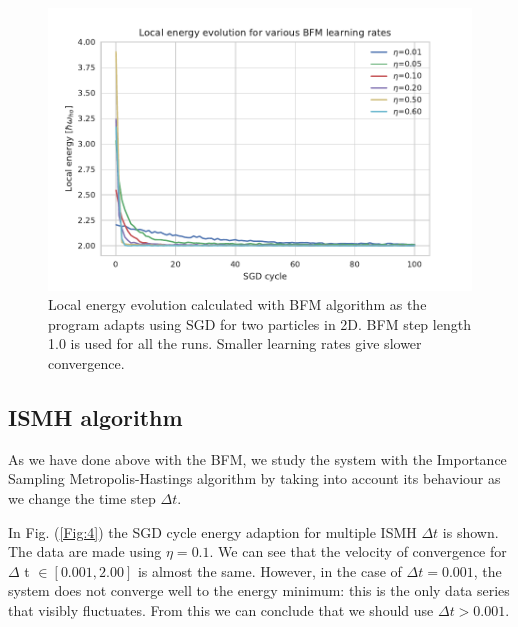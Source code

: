 \begin{figure}[H]
\centering
\includegraphics[scale=1.00]{plot3.pdf}
\caption{Local energy evolution calculated with BFM algorithm as the program adapts using SGD for two particles in 2D. BFM step length 1.0 is used for all the runs. Smaller learning rates give slower convergence.}
\label{Fig:3}
\end{figure}


\subsection{ISMH algorithm}

As we have done above with the BFM, we study the system with the Importance Sampling Metropolis-Hastings algorithm by taking into account its behaviour as we change the time step $\Delta t$. 

In Fig. (\ref{Fig:4}) the SGD cycle energy adaption for multiple ISMH $\Delta t$  is shown. The data are made using $\eta = 0.1$. We can see that the velocity of convergence for $\Delta$ t $\in [0.001,2.00]$ is almost the same. However, in the case of $\Delta t=0.001$, the system does not converge well to the energy minimum: this is the only data series that visibly fluctuates. From this we can conclude that we should use $\Delta t > 0.001$. 

